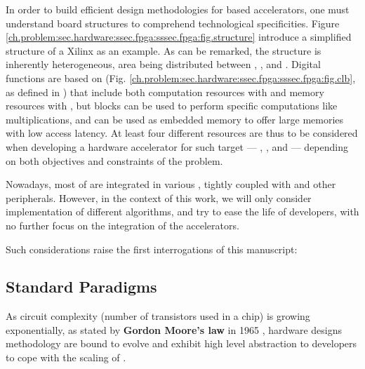             In order to build efficient design methodologies for  based accelerators, one must understand board structures to comprehend technological specificities.
            Figure \ref{ch.problem:sec.hardware:ssec.fpga:sssec.fpga:fig.structure} introduce a simplified structure of a Xilinx  as an example.
            As can be remarked, the structure is inherently heterogeneous, area being distributed between , ,  and .
            Digital functions are based on  (Fig. \ref{ch.problem:sec.hardware:ssec.fpga:sssec.fpga:fig.clb}, as defined in \cite{xilinx_clb_2016}) that include both computation resources with  and memory resources with , but  blocks can be used to perform specific computations like multiplications, and  can be used as embedded memory to offer large memories with low access latency.
            At least four different resources are thus to be considered when developing a hardware accelerator for such target --- , ,  and  --- depending on both objectives and constraints of the problem.

            Nowadays, most of  are integrated in various , tightly coupled with  and other peripherals.
            However, in the context of this work, we will only consider  implementation of different algorithms, and try to ease the life of  developers, with no further focus on the integration of the accelerators.

            Such considerations raise the first interrogations of this manuscript: 

    \subsection{Standard Paradigms}
    \label{ch.problem:sec.hardware:ssec.paradigms}
        As circuit complexity (\ie number of transistors used in a chip) is growing exponentially, as stated by {\bf Gordon Moore's law} in 1965 \cite{moore_cramming_1965}, hardware designs methodology are bound to evolve and exhibit high level abstraction to developers to cope with the scaling of . 

